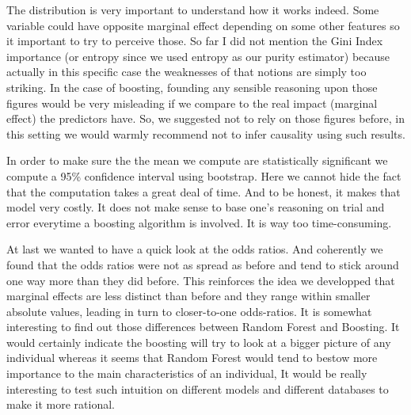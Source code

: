 
The distribution is very important to understand how it works indeed. Some variable could have opposite marginal effect depending on some other features so it important to try to perceive those.
So far I did not mention the Gini Index importance (or entropy since we used entropy as our purity estimator) because actually in this specific case the weaknesses of that notions are simply too striking. In the case of boosting, founding any sensible reasoning upon those figures would be very misleading if we compare to the real impact (marginal effect) the predictors have. So, we suggested not to rely on those figures before, in this setting we would warmly recommend not to infer causality using such results.


In order to make sure the the mean we compute are statistically significant we compute a 95\% confidence interval using bootstrap. Here we cannot hide the fact that the computation takes a great deal of time. And to be honest, it makes that model very costly. It does not make sense to base one’s reasoning on trial and error everytime a boosting algorithm is involved. It is way too time-consuming.


At last we wanted to have a quick look at the odds ratios.
And coherently we found that the odds ratios were not as spread as before and tend to stick around one way more than they did before. This reinforces the idea we developped that marginal effects are less distinct than before and they range within smaller absolute values, leading in turn to closer-to-one odds-ratios.
It is somewhat interesting to find out those differences between Random Forest and Boosting. It would certainly indicate the boosting will try to look at a bigger picture of any individual whereas it seems that Random Forest would tend to bestow more importance to the main characteristics of an individual, It would be really interesting to test such intuition on different models and different databases to make it more rational.

